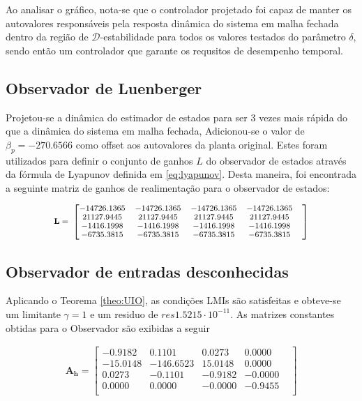 Ao analisar o gráfico, nota-se que o controlador projetado foi capaz de manter os autovalores responsáveis pela resposta dinâmica do sistema em malha fechada dentro da região de \( \mathcal{D}\)-estabilidade para todos os valores testados do parâmetro $\delta$, sendo então um controlador que garante os requsitos de desempenho temporal.
\subsection{Observador de Luenberger}
Projetou-se a dinâmica do estimador de estados para ser 3 vezes  mais rápida do que a dinâmica do sistema em malha fechada, Adicionou-se o valor de $\beta_p=-270.6566$ como offset aos autovalores da planta original.
Estes foram utilizados para definir o conjunto de ganhos $L$ do observador de estados através da fórmula de Lyapunov definida em \eqref{eq:lyapunov}. 
Desta maneira, foi encontrada a seguinte matriz de ganhos de realimentação para o observador de estados:

\begin{equation} \label{eq:ganhos_pred} \small
    \begin{split}
        \mathbf{L}=\
    \end{split}
    \begin{bmatrix}
       -14726.1365& -14726.1365& -14726.1365& -14726.1365&\\
        21127.9445&  21127.9445&  21127.9445&  21127.9445&\\
        -1416.1998&  -1416.1998&  -1416.1998&  -1416.1998&\\
        -6735.3815&  -6735.3815&  -6735.3815&  -6735.3815&\\
    \end{bmatrix}
\end{equation}
 
\subsection{Observador de entradas desconhecidas}
Aplicando o Teorema \ref{theo:UIO}, as condições LMIs são satisfeitas e obteve-se um limitante $\gamma=1$ e um residuo de $res1.5215\cdot10^{-11}$. As matrizes constantes obtidas para o Observador são exibidas a seguir

\begin{equation*}\label{ed:UIO:Ah}
    \begin{split}
        \mathbf{A_h} =
        \begin{bmatrix}
            -0.9182&     0.1101&   0.0273&  0.0000&\\
            -15.0148& -146.6523& 15.0148&  0.0000&\\
              0.0273&   -0.1101& -0.9182& -0.0000&\\
              0.0000&   0.0000& -0.0000& -0.9455&\\
        \end{bmatrix}
    \end{split}
\end{equation*}

